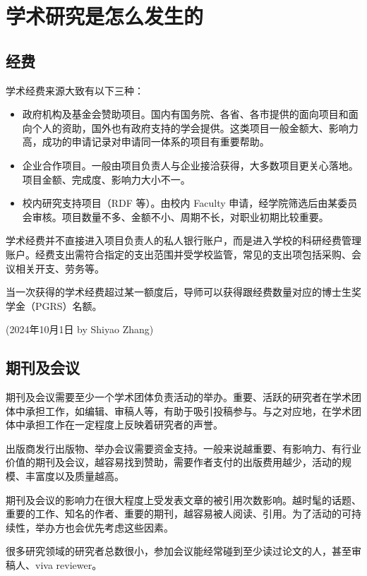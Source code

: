 \section{学术研究是怎么发生的}
\label{section.how-research-works}

\subsection{经费}
学术经费来源大致有以下三种：
\begin{itemize}
    \item 政府机构及基金会赞助项目。国内有国务院、各省、各市提供的面向项目和面向个人的资助，国外也有政府支持的学会提供。这类项目一般金额大、影响力高，成功的申请记录对申请同一体系的项目有重要帮助。
    \item 企业合作项目。一般由项目负责人与企业接洽获得，大多数项目更关心落地。项目金额、完成度、影响力大小不一。
    \item 校内研究支持项目（RDF 等）。由校内 Faculty 申请，经学院筛选后由某委员会审核。项目数量不多、金额不小、周期不长，对职业初期比较重要。
\end{itemize}

学术经费并不直接进入项目负责人的私人银行账户，而是进入学校的科研经费管理账户。经费支出需符合指定的支出范围并受学校监管，常见的支出项包括采购、会议相关开支、劳务等。

当一次获得的学术经费超过某一额度后，导师可以获得跟经费数量对应的博士生奖学金（PGRS）名额。

\begin{flushright}
    (2024年10月1日 by Shiyao Zhang)
\end{flushright}


\subsection{期刊及会议}
期刊及会议需要至少一个学术团体负责活动的举办。重要、活跃的研究者在学术团体中承担工作，如编辑、审稿人等，有助于吸引投稿参与。与之对应地，在学术团体中承担工作在一定程度上反映着研究者的声誉。

出版商发行出版物、举办会议需要资金支持。一般来说越重要、有影响力、有行业价值的期刊及会议，越容易找到赞助，需要作者支付的出版费用越少，活动的规模、丰富度以及质量越高。

期刊及会议的影响力在很大程度上受发表文章的被引用次数影响。越时髦的话题、重要的工作、知名的作者、重要的期刊，越容易被人阅读、引用。为了活动的可持续性，举办方也会优先考虑这些因素。

很多研究领域的研究者总数很小，参加会议能经常碰到至少读过论文的人，甚至审稿人、viva reviewer。

